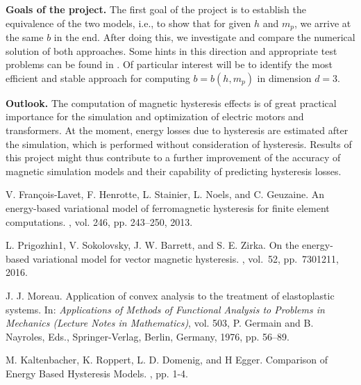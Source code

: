 \documentclass[12pt]{article}
\begin{document}
\newpage

\textbf{Goals of the project.}
%
The first goal of the project is to establish the equivalence of the two models, i.e., to show that for given $h$ and $m_p$, we arrive at the same $b$ in the end.
%
After doing this, we investigate and compare the numerical solution of both approaches. Some hints in this direction and appropriate test problems can be found in \cite{Lavet,Prigozhin}. 
%
Of particular interest will be to identify the most efficient and stable approach for computing $b=b(h,m_p)$ in dimension $d=3$.

\bigskip 

\textbf{Outlook.}
%
The computation of magnetic hysteresis effects is of great practical importance for the simulation and optimization of electric motors and transformers.  
%
At the moment, energy losses due to hysteresis are estimated after the simulation, which is performed without consideration of hysteresis. 
%
Results of this project might thus contribute to a further improvement of the accuracy of magnetic simulation models and their capability of predicting hysteresis losses.


\begin{thebibliography}{10}

V. François-Lavet, F. Henrotte, L. Stainier, L. Noels, and C. Geuzaine.
\newblock An energy-based variational model of ferromagnetic hysteresis for finite element computations.
, vol. 246, pp. 243–250, 2013.

L. Prigozhin1, V. Sokolovsky, J. W. Barrett, and S. E. Zirka. 
\newblock On the energy-based variational model
for vector magnetic hysteresis.
, vol.~52, pp.~7301211, 2016.

J. J. Moreau. 
\newblock Application of convex analysis to the treatment of elastoplastic systems. 
\newblock In: {\em Applications of Methods of Functional Analysis to Problems in Mechanics (Lecture Notes in Mathematics)}, vol. 503, 
P. Germain and B. Nayroles, Eds.,
Springer-Verlag, Berlin, Germany, 1976, pp. 56–89.

M. Kaltenbacher, K. Roppert, L. D. Domenig, and H Egger.
\newblock Comparison of Energy Based Hysteresis Models.
, pp. 1-4. %
\end{thebibliography}
\end{document}

